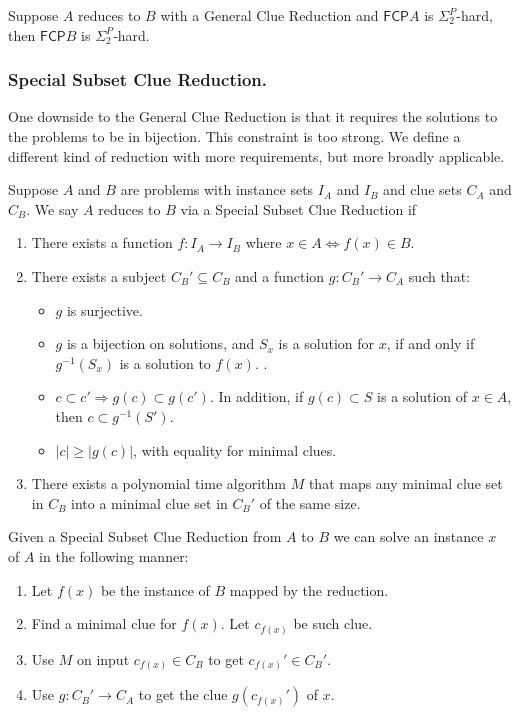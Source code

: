 \documentclass[runningheads,a4paper]{llncs}
\begin{document}
\begin{corollary}
\label{thm:reduction}
Suppose $A$ reduces to $B$ with a General Clue Reduction and $\mathsf{FCP} A$ is $\Sigma_2^P$-hard, then $\mathsf{FCP} B$ is $\Sigma_2^P$-hard. 
\end{corollary}

\subsubsection{Special Subset Clue Reduction.} 

One downside to the General Clue Reduction is that it requires the solutions to the problems to be in bijection. This constraint is too strong. We define a different kind of reduction with more requirements, but more broadly applicable.

\begin{definition}\label{def:SSCR}
Suppose $A$ and $B$ are problems with instance sets $I_A$ and $I_B$ and clue sets $C_A$ and $C_B$. We say $A$ reduces to $B$ via a Special Subset Clue Reduction if
\begin{enumerate}
\item There exists a function $f: I_A \rightarrow I_B$ where $x \in A \iff f(x) \in B$.
\item There exists a subject $C_B' \subseteq C_B$ and a function $g: C_B' \rightarrow C_A$ such that:
\begin{itemize}
\item $g$ is surjective. 
\item $g$ is a bijection on solutions, and $S_x$ is a solution for $x$, if and only if $g^{-1}(S_x)$ is a solution to $f(x)$. .
\item $c \subset c' \Rightarrow g(c) \subset g(c')$. In addition, if $g(c) \subset S$ is a solution of $x \in A$, then $c \subset g^{-1}(S')$.
\item $|c| \geq |g(c)|$, with equality for minimal clues. 
\end{itemize}
\item There exists a polynomial time algorithm $M$ that maps any minimal clue set in $C_B$ into a minimal clue set in $C_B'$ of the same size. 
\end{enumerate}
\end{definition}

Given a Special Subset Clue Reduction from $A$ to $B$ we can solve an instance $x$ of $A$ in the following manner:
\begin{enumerate}
\item Let $f(x)$ be the instance of $B$ mapped by the reduction.
\item Find a minimal clue for $f(x)$. Let $c_{f(x)}$ be such clue. 
\item Use $M$ on input $c_{f(x)} \in C_B$ to get $c_{f(x)}' \in C_B'$. 
\item Use $g: C_B' \rightarrow C_A$ to get the clue $g(c_{f(x)}')$ of $x$.
\end{enumerate}
\end{document}
